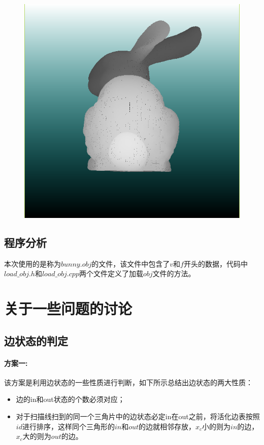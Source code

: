 \documentclass[10pt]{article}
\begin{document}
\begin{figure}[H]
\begin{center}
\includegraphics[scale=0.5]{bunny.png}
\end{center}
\end{figure}
\subsection{程序分析}
本次使用的是称为$bunny.obj$的文件，该文件中包含了$v$和$f$开头的数据，代码中$load\_obj.h$和$load\_obj.cpp$两个文件定义了加载$obj$文件的方法。

\section{关于一些问题的讨论}
\subsection{边状态的判定}
\paragraph{方案一:}
该方案是利用边状态的一些性质进行判断，如下所示总结出边状态的两大性质：
\begin{itemize}
\item{边的in和out状态的个数必须对应；}
\item{对于扫描线扫到的同一个三角片中的边状态必定in在out之前，将活化边表按照$id$进行排序，这样同个三角形的$in$和$out$的边就相邻存放，$x_c$小的则为$in$的边，$x_c$大的则为$out$的边。}
\end{itemize}
\end{document}
